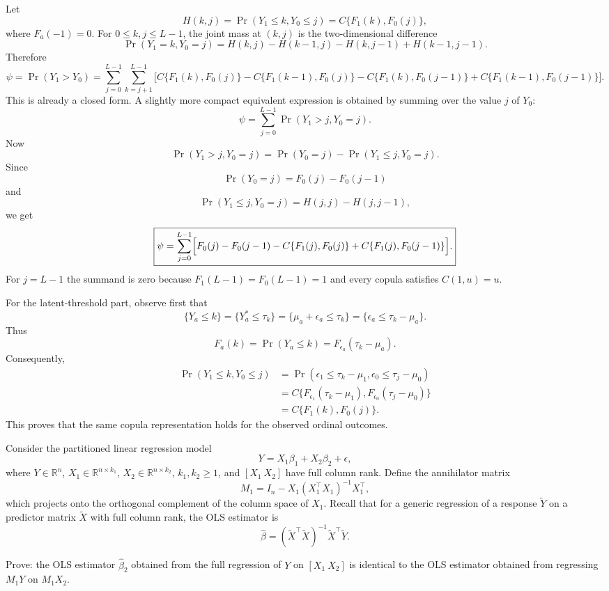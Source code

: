 \begin{solution}
Let
\[
H(k,j)=\Pr(Y_1\leq k,Y_0\leq j)=C\{F_1(k),F_0(j)\},
\]
where $F_a(-1)=0$. For $0\leq k,j\leq L-1$, the joint mass at $(k,j)$ is the two-dimensional difference
\[
\Pr(Y_1=k,Y_0=j)
=H(k,j)-H(k-1,j)-H(k,j-1)+H(k-1,j-1).
\]
Therefore
\[
\psi
=\Pr(Y_1>Y_0)
=\sum_{j=0}^{L-1}\sum_{k=j+1}^{L-1}
\bigl[
C\{F_1(k),F_0(j)\}
-C\{F_1(k-1),F_0(j)\}
-C\{F_1(k),F_0(j-1)\}
+C\{F_1(k-1),F_0(j-1)\}
\bigr].
\]
This is already a closed form. A slightly more compact equivalent expression is obtained by summing over the value $j$ of $Y_0$:
\[
\psi
=\sum_{j=0}^{L-1}\Pr(Y_1>j,Y_0=j).
\]
Now
\[
\Pr(Y_1>j,Y_0=j)
=\Pr(Y_0=j)-\Pr(Y_1\leq j,Y_0=j).
\]
Since
\[
\Pr(Y_0=j)=F_0(j)-F_0(j-1)
\]
and
\[
\Pr(Y_1\leq j,Y_0=j)
=H(j,j)-H(j,j-1),
\]
we get
\[
\boxed{
\psi
=\sum_{j=0}^{L-1}
\Bigl[
F_0(j)-F_0(j-1)
-C\{F_1(j),F_0(j)\}
+C\{F_1(j),F_0(j-1)\}
\Bigr].
}
\]
For $j=L-1$ the summand is zero because $F_1(L-1)=F_0(L-1)=1$ and every copula satisfies $C(1,u)=u$.

For the latent-threshold part, observe first that
\[
\{Y_a\leq k\}=\{Y_a^*\leq \tau_k\}
=\{\mu_a+\epsilon_a\leq \tau_k\}
=\{\epsilon_a\leq \tau_k-\mu_a\}.
\]
Thus
\[
F_a(k)=\Pr(Y_a\leq k)
=F_{\epsilon_a}(\tau_k-\mu_a).
\]
Consequently,
\[
\begin{aligned}
\Pr(Y_1\leq k,Y_0\leq j)
&=\Pr(\epsilon_1\leq \tau_k-\mu_1,\epsilon_0\leq \tau_j-\mu_0)\\
&=C\{F_{\epsilon_1}(\tau_k-\mu_1),F_{\epsilon_0}(\tau_j-\mu_0)\}\\
&=C\{F_1(k),F_0(j)\}.
\end{aligned}
\]
This proves that the same copula representation holds for the observed ordinal outcomes.
\end{solution}

\begin{exercise}\label{probability:2026:2}
Consider the partitioned linear regression model
\[
Y=X_1\beta_1+X_2\beta_2+\epsilon,
\]
where $Y\in\mathbb{R}^n$, $X_1\in\mathbb{R}^{n\times k_1}$, $X_2\in\mathbb{R}^{n\times k_2}$, $k_1,k_2\geq 1$, and $[X_1\ X_2]$ have full column rank. Define the annihilator matrix
\[
M_1=I_n-X_1{(X_1^\top X_1)}^{-1}X_1^\top,
\]
which projects onto the orthogonal complement of the column space of $X_1$. Recall that for a generic regression of a response $\widetilde{Y}$ on a predictor matrix $\widetilde{X}$ with full column rank, the OLS estimator is
\[
\widehat{\beta}={(\widetilde{X}^\top\widetilde{X})}^{-1}\widetilde{X}^\top\widetilde{Y}.
\]

Prove: the OLS estimator $\widehat{\beta}_2$ obtained from the full regression of $Y$ on $[X_1\ X_2]$ is identical to the OLS estimator obtained from regressing $M_1Y$ on $M_1X_2$.
\end{exercise}

